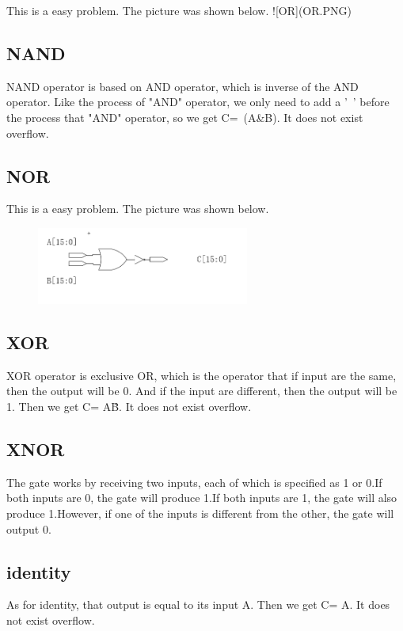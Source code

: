 \documentclass[12pt,a4paper]{article}
\begin{document}
This is a easy problem.
The picture was shown below.
![OR](OR.PNG)

\subsection{NAND}

NAND operator is based on AND operator, which is inverse of the AND operator.
Like the process of "AND" operator, we only need to add a '~' before the process that "AND" operator, so we get C=~(A\&B).
It does not exist overflow.

\subsection{NOR}

This is a easy problem.
The picture was shown below.
\begin{figure}[H]
  \centering
  \includegraphics[height=1in]{NOR.PNG}
  \end{figure}

\subsection{XOR}

XOR operator is exclusive OR, which is the operator that if input are the same, then the output will be 0.
And if the input are different, then the output will be 1.
Then we get C= A\^B.
It does not exist overflow.

\subsection{XNOR}

The gate works by receiving two inputs, each of which is specified as 1 or 0.If both inputs are 0, the gate will produce 1.If both inputs are 1, the gate will also produce 1.However, if one of the inputs is different from the other, the gate will output 0.

\subsection{identity}
As for identity, that output is equal to its input A.
Then we get C= A.
It does not exist overflow.
\end{document}

